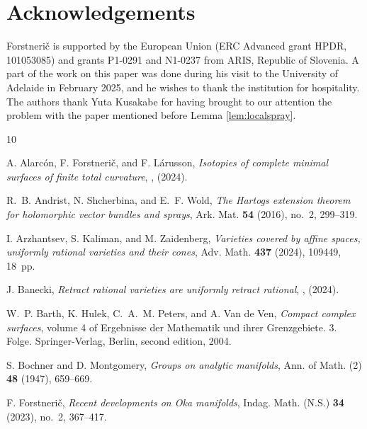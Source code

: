 \documentclass[12pt]{amsart}
\theoremstyle{definition}
\numberwithin{equation}{section}
\numberwithin{figure}{section}
\numberwithin{equation}{section}
\begin{document}
%
%
\section*{Acknowledgements}
Forstneri\v c is supported by the European Union 
(ERC Advanced grant HPDR, 101053085) 
and grants P1-0291 and N1-0237 from ARIS, Republic of Slovenia. 
A part of the work on this paper was done during his visit to the University
of Adelaide in February 2025, and he wishes to thank the institution for 
hospitality. The authors thank Yuta Kusakabe for having brought
to our attention the problem with the paper \cite{Prezelj2010}  
mentioned before Lemma \ref{lem:localspray}. 




\begin{thebibliography}{10}

A. Alarc\'on, F. Forstneri\v{c}, and F. L\'arusson,
\newblock \emph{Isotopies of complete minimal surfaces of finite total curvature},
, (2024).

R.~B. Andrist, N. Shcherbina, and E.~F. Wold,
\newblock \emph{The Hartogs extension theorem for holomorphic vector bundles and sprays},
\newblock Ark. Mat. \textbf{54} (2016), no.~2, 299--319.

I. Arzhantsev, S. Kaliman, and M. Zaidenberg,
\newblock \emph{Varieties covered by affine spaces, uniformly rational varieties and their cones},
\newblock Adv. Math. \textbf{437} (2024), 109449, 18~pp.

J. Banecki,
\newblock \emph{Retract rational varieties are uniformly retract rational},
, (2024).

W.~P. Barth, K. Hulek, C.~A.~M. Peters, and A. Van de Ven,
\newblock \emph{Compact complex surfaces},
\newblock volume 4 of Ergebnisse der Mathematik und ihrer Grenzgebiete. 3. Folge. Springer-Verlag, Berlin, second edition, 2004.

S. Bochner and D. Montgomery,
\newblock \emph{Groups on analytic manifolds},
\newblock Ann. of Math. (2) \textbf{48} (1947), 659--669.

F. Forstneri{\v{c}},
\newblock \emph{Recent developments on Oka manifolds},
\newblock Indag. Math. (N.S.) \textbf{34} (2023), no.~2, 367--417.


\end{thebibliography}
\end{document}
